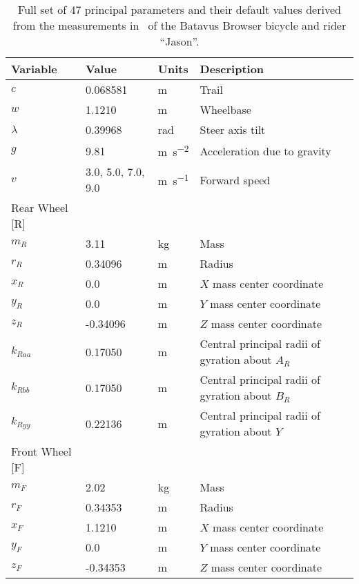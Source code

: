 \documentclass{bmd2019a}
\begin{document}
\begin{table}
  \caption{Full set of 47 principal parameters and their default values derived
    from the measurements in~\cite{Moore2012} of the Batavus Browser bicycle
    and rider ``Jason''.}
  \label{tab:parameters}
  \centering
  \begin{tabular}{llll}
    \toprule
    Variable & Value & Units & Description \\
    \midrule
    $c$       &  0.068581           & \si{\meter} & Trail \\
    $w$       &  1.1210             & \si{\meter} & Wheelbase \\
    $\lambda$ & 0.39968             & \si{\radian} & Steer axis tilt \\
    $g$       &  9.81               & \si{\meter\per\second\squared} & Acceleration due to gravity \\
    $v$       &  3.0, 5.0, 7.0, 9.0 & \si{\meter\per\second} & Forward speed \\
    Rear Wheel [R] & & \\
    \midrule
    $m_R$     & 3.11 & \si{\kilogram}  & Mass \\
    $r_R$     & 0.34096 & \si{\meter}  & Radius \\
    $x_R$     & 0.0 & \si{\meter}      & $X$ mass center coordinate \\
    $y_R$     & 0.0 & \si{\meter}      & $Y$ mass center coordinate \\
    $z_R$     & -0.34096 & \si{\meter} & $Z$ mass center coordinate \\
    $k_{Raa}$ & 0.17050 & \si{\meter}  & Central principal radii of gyration about $A_R$ \\
    $k_{Rbb}$ & 0.17050 & \si{\meter}  & Central principal radii of gyration about $B_R$ \\
    $k_{Ryy}$ & 0.22136 & \si{\meter}  & Central principal radii of gyration about $Y$ \\
    Front Wheel [F] & & \\
    \midrule
    $m_F$     & 2.02 & \si{\kilogram} & Mass \\
    $r_F$     & 0.34353 & \si{\meter} & Radius \\
    $x_F$     & 1.1210 & \si{\meter} & $X$ mass center coordinate \\
    $y_F$     & 0.0 & \si{\meter} & $Y$ mass center coordinate \\
    $z_F$     & -0.34353 & \si{\meter} & $Z$ mass center coordinate \\

\end{tabular}
\end{table}
\end{document}
